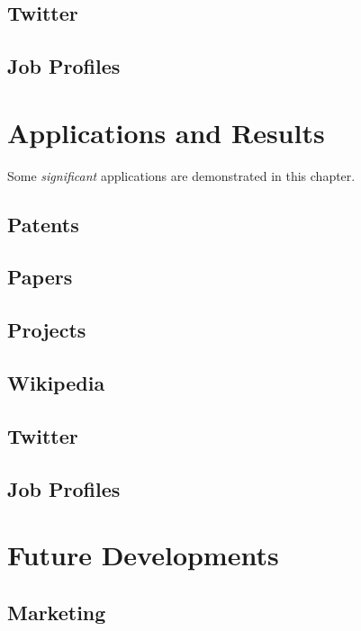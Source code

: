 \documentclass[]{book}
\begin{document}
\section{Twitter}\label{twitter-1}

\section{Job Profiles}\label{job-profiles-1}

\chapter{Applications and Results}\label{applications-and-results}

Some \emph{significant} applications are demonstrated in this chapter.

\section{Patents}\label{patents-2}

\section{Papers}\label{papers-2}

\section{Projects}\label{projects-2}

\section{Wikipedia}\label{wikipedia-2}

\section{Twitter}\label{twitter-2}

\section{Job Profiles}\label{job-profiles-2}

\chapter{Future Developments}\label{future-developments}

\section{Marketing}\label{marketing-1}
\end{document}
